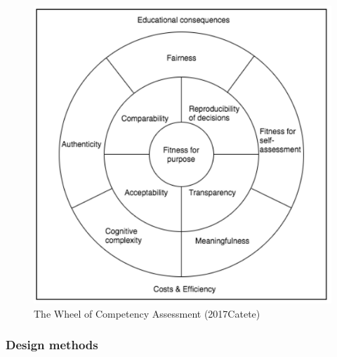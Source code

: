 \begin{figure}
\includegraphics[scale=0.6]{figures/AdaptedQualityCriteriaCatete.png}
\caption{The Wheel of Competency Assessment (2017Catete)}\label{fig:AdaptedQualityCriteriaCatete}
\end{figure}



\subsubsection*{Design methods}





